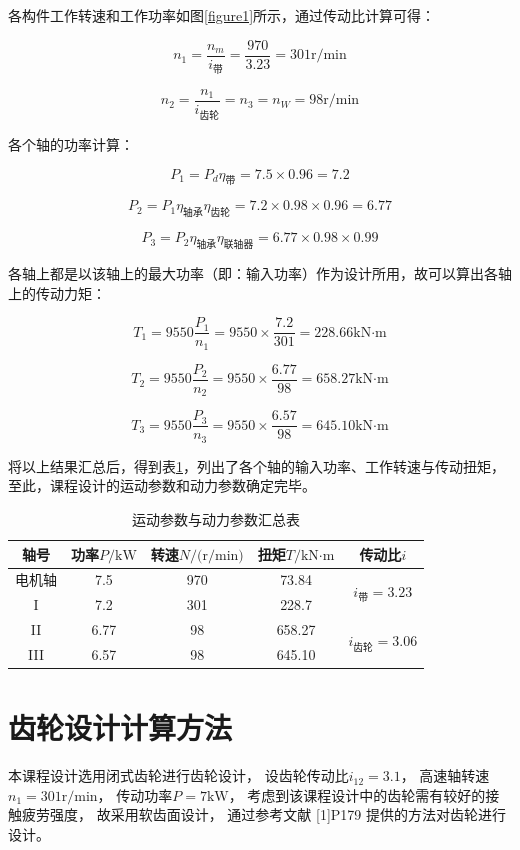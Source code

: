 \documentclass[12pt]{ctexart}
\begin{document}
各构件工作转速和工作功率如图\ref{figure1}所示，通过传动比计算可得：

$$n_1=\frac{n_m}{i_\text{带}}=\frac{970}{3.23}=301\text{r/min}$$

$$n_2=\frac{n_1}{i_{\text{齿轮}}}=n_3=n_W=98\text{r/min}$$

各个轴的功率计算：

$$P_1 = P_d\eta_{\text{带}}=7.5\times 0.96 = 7.2$$

$$P_2 = P_1 \eta_{\text{轴承}}\eta_{\text{齿轮}}=7.2\times 0.98\times 0.96 = 6.77$$

$$P_3 = P_2 \eta_{\text{轴承}}\eta_{\text{联轴器}}=6.77\times 0.98\times 0.99$$

各轴上都是以该轴上的最大功率（即：输入功率）作为设计所用，故可以算出各轴上的传动力矩：

$$T_1 = 9550\frac{P_1}{n_1} = 9550\times \frac{7.2}{301}=228.66\text{kN·m}$$

$$T_2 = 9550\frac{P_2}{n_2} = 9550\times \frac{6.77}{98}=658.27\text{kN·m}$$

$$T_3 = 9550\frac{P_3}{n_3} = 9550\times \frac{6.57}{98}=645.10\text{kN·m}$$

将以上结果汇总后，得到表\ref{table1}，列出了各个轴的输入功率、工作转速与传动扭矩，至此，课程设计的运动参数和动力参数确定完毕。

\begin{table}[h]
    \centering
    \begin{tabular}{c c c c c}
        \toprule
        轴号 & 功率$P/\text{kW}$ & 转速$N/\text{(r/min)}$ & 扭矩$T/\text{kN·m}$ & 传动比$i$ \\
        \midrule
        电机轴 & 7.5 & 970 & 73.84 & \multirow{ 2}{*}{$i_{\text{带}}=3.23$}\\
        I & 7.2 & 301 & 228.7 & \\
        II & 6.77 & 98 & 658.27 & \multirow{ 2}{*}{$i_{\text{齿轮}}=3.06$}\\
        III & 6.57 & 98 & 645.10 & \\
        \bottomrule
    \end{tabular}
    \caption{运动参数与动力参数汇总表}\label{table1}
\end{table}
    


\section{齿轮设计计算方法}

本课程设计选用闭式齿轮进行齿轮设计，
设齿轮传动比$i_{12}=3.1$，
高速轴转速$n_1=301 \text{r/min}$，
传动功率$P=7\text{kW}$，
考虑到该课程设计中的齿轮需有较好的接触疲劳强度，
故采用软齿面设计，
通过参考文献 [1]P179 提供的方法对齿轮进行设计。
\end{document}
